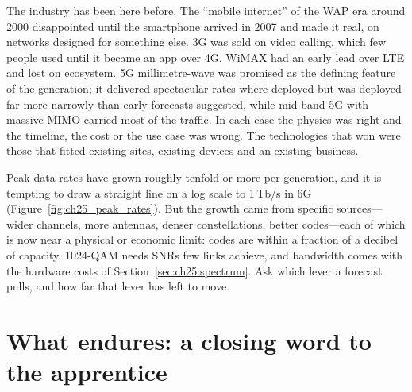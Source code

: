 
\begin{history}
The industry has been here before. The ``mobile internet'' of the WAP era around 2000 disappointed
until the smartphone arrived in 2007 and made it real, on networks designed for something else. 3G
was sold on video calling, which few people used until it became an app over 4G. WiMAX had an early
lead over LTE and lost on ecosystem. 5G millimetre-wave was promised as the defining feature of the
generation; it delivered spectacular rates where deployed but was deployed far more narrowly than early
forecasts suggested, while mid-band 5G with massive MIMO carried most of the traffic. In each case the
physics was right and the timeline, the cost or the use case was wrong. The technologies that won
were those that fitted existing sites, existing devices and an existing business.
\end{history}

\begin{pitfall}
Peak data rates have grown roughly tenfold or more per generation, and it is tempting to draw a
straight line on a log scale to 1\,Tb/s in 6G (Figure~\ref{fig:ch25_peak_rates}). But the growth came
from specific sources---wider channels, more antennas, denser constellations, better codes---each of
which is now near a physical or economic limit: codes are within a fraction of a decibel of capacity,
1024-QAM needs SNRs few links achieve, and bandwidth comes with the hardware costs of
Section~\ref{sec:ch25:spectrum}. Ask which lever a forecast pulls, and how far that lever has left to
move.
\end{pitfall}

\section{What endures: a closing word to the apprentice}
\label{sec:ch25:closing}


